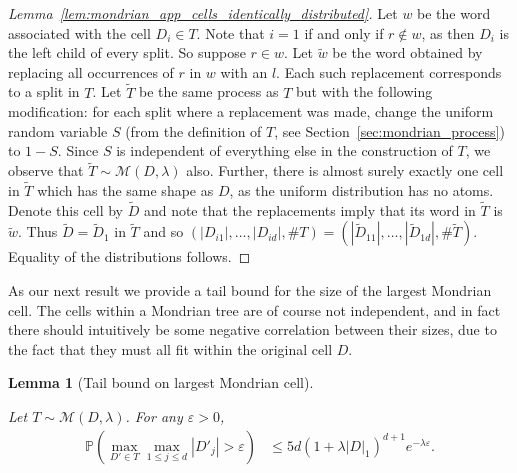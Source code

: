 \documentclass[11pt,lof]{puthesis}
\renewcommand{\P}{\ensuremath{\mathbb{P}}}
\newcommand{\cM}{\ensuremath{\mathcal{M}}}
\theoremstyle{break}
\newtheorem{lemma}{Lemma}[section]
\theoremstyle{proof}
\newtheorem{proof}{Proof}
\begin{document}
\begin{proof}[Lemma~\ref{lem:mondrian_app_cells_identically_distributed}]

Let $w$ be the word associated with the cell $D_i \in T$.
Note that $i=1$ if and only if $r \notin w$, as then $D_i$ is the left child
of every split.
So suppose $r \in w$.
Let $\tilde w$ be the word obtained by replacing all occurrences
of $r$ in $w$ with an $l$.
Each such replacement corresponds to a split in $T$.
Let $\tilde T$ be the same process as $T$ but with the following
modification: for each split where a replacement was made,
change the uniform random variable $S$
(from the definition of $T$, see Section~\ref{sec:mondrian_process}) to $1-S$.
Since $S$ is independent of everything else in the construction of $T$,
we observe that $\tilde T \sim \cM(D, \lambda)$ also.
Further, there is almost surely exactly one cell in $\tilde T$
which has the same shape as $D$, as the uniform distribution has no atoms.
Denote this cell by $\tilde D$ and note that
the replacements imply that its word in $\tilde T$
is $\tilde w$.
Thus $\tilde D = \tilde D_1$ in $\tilde T$ and so
$(|D_{i1}|, \ldots, |D_{i d}|, \# T)
= (|\tilde D_{11}|, \ldots, |\tilde D_{1d}|, \# \tilde T)$.
Equality of the distributions follows.
\end{proof}

As our next result we provide a tail bound for the size of the largest
Mondrian cell. The cells within a Mondrian tree are of course not independent,
and in fact there should intuitively be some negative correlation between their
sizes, due to the fact that they must all fit within the original cell $D$.

\begin{lemma}[Tail bound on largest Mondrian cell]
\label{lem:mondrian_app_largest_cell_tail}

Let $T \sim \cM(D, \lambda)$.
For any $\varepsilon > 0$,
%
\begin{align*}
\P\left(
\max_{D' \in T}
\max_{1 \leq j \leq d}
|D'_j| > \varepsilon
\right)
&\leq
5d (1 + \lambda |D|_1)^{d+1}
e^{-\lambda \varepsilon}.
\end{align*}
%
\end{lemma}
\end{document}
